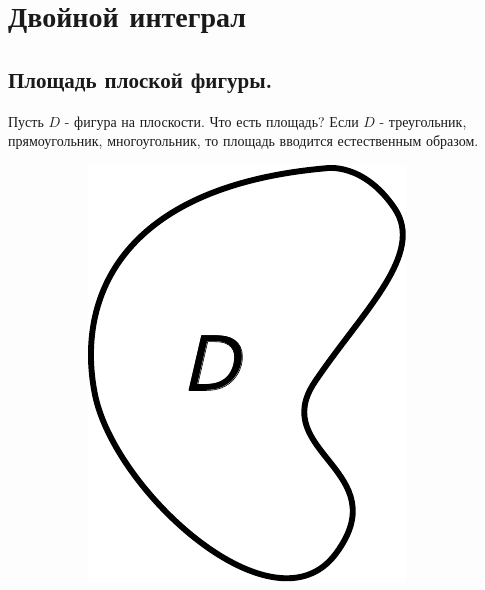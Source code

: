 \documentclass[a4paper, 14pt]{report}
\theoremstyle{definition}
\begin{document}
	
\tableofcontents
\chapter{Двойной интеграл}	
	\section{Площадь плоской фигуры.}
		Пусть $D$ - фигура на плоскости. Что есть площадь? Если $D$ - треугольник, прямоугольник, многоугольник, то площадь вводится естественным образом.
		\begin{figure}[!htp]
			\centering
			\begin{subfigure}{0.20\linewidth}
				\includegraphics[width=1\linewidth]{sampleD}
				\caption{}
				\label{fig:area_d}
			\end{subfigure}
			\hfill
			\begin{subfigure}{0.20\linewidth}

\end{subfigure}
\end{figure}
\end{document}
